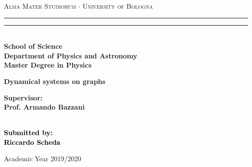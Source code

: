 \begin{titlepage}
\begin{center}
{{\Large{\textsc{Alma Mater Studiorum $\cdot$ University of  Bologna}}}}
\rule[0.1cm]{15.8cm}{0.1mm}
\rule[0.5cm]{15.8cm}{0.6mm}
\\\vspace{3mm}
{\small{\bf School of Science \\
Department of Physics and Astronomy\\
Master Degree in Physics}}
\end{center}

\vspace{23mm}

\begin{center}
    \LARGE{\bf Dynamical systems on graphs}\\
\end{center}

\vspace{50mm} \par \noindent

\begin{minipage}[t]{0.47\textwidth}
{\large{\bf Supervisor: \vspace{2mm}\\
Prof. Armando Bazzani}\\\\}
\end{minipage}
%
\hfill
%
\begin{minipage}[t]{0.47\textwidth}\raggedleft
    \textcolor{black}{
        {\large{\bf Submitted by:
            \vspace{2mm}\\
            {Riccardo Scheda}}}
    }
\end{minipage}

\vspace{40mm}

\begin{center}
Academic Year 2019/2020
\end{center}
\end{titlepage}
